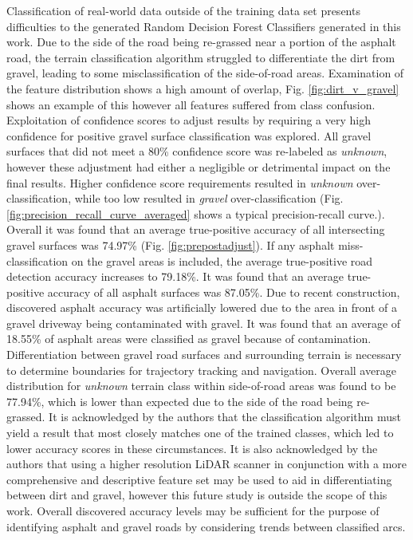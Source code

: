\documentclass[journal,onecolumn]{IEEEtran}
\begin{document}
		{Classification of real-world data outside of the training data set presents difficulties to the generated Random Decision Forest Classifiers generated in this work. Due to the side of the road being re-grassed near a portion of the asphalt road, the terrain classification algorithm struggled to differentiate the dirt from gravel, leading to some misclassification of the side-of-road areas. Examination of the feature distribution shows a high amount of overlap, Fig. \ref{fig:dirt_v_gravel} shows an example of this however all features suffered from class confusion. Exploitation of confidence scores to adjust results by requiring a very high confidence for positive gravel surface classification was explored. All gravel surfaces that did not meet a 80\% confidence score was re-labeled as \textit{unknown}, however these adjustment had either a negligible or detrimental impact on the final results. Higher confidence score requirements resulted in \textit{unknown} over-classification, while too low resulted in \textit{gravel} over-classification (Fig. \ref{fig:precision_recall_curve_averaged} shows a typical precision-recall curve.). Overall it was found that an average true-positive accuracy of all intersecting gravel surfaces was 74.97\% (Fig. \ref{fig:prepostadjust}). If any asphalt miss-classification on the gravel areas is included, the average true-positive road detection accuracy increases to 79.18\%. It was found that an average true-positive accuracy of all asphalt surfaces was 87.05\%. Due to recent construction, discovered asphalt accuracy was artificially lowered due to the area in front of a gravel driveway being contaminated with gravel. It was found that an average of 18.55\% of asphalt areas were classified as gravel because of contamination. Differentiation between gravel road surfaces and surrounding terrain is necessary to determine boundaries for trajectory tracking and navigation. Overall average distribution for \textit{unknown} terrain class within side-of-road areas was found to be 77.94\%, which is lower than expected due to the side of the road being re-grassed. It is acknowledged by the authors that the classification algorithm must yield a result that most closely matches one of the trained classes, which led to lower accuracy scores in these circumstances. It is also acknowledged by the authors that using a higher resolution LiDAR scanner in conjunction with a more comprehensive and descriptive feature set may be used to aid in differentiating between dirt and gravel, however this future study is outside the scope of this work. Overall discovered accuracy levels may be sufficient for the purpose of identifying asphalt and gravel roads by considering trends between classified arcs.}
\end{document}
